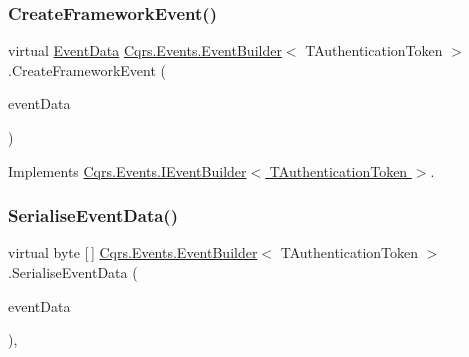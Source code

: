 \subsubsection{\texorpdfstring{Create\+Framework\+Event()}{CreateFrameworkEvent()}\hspace{0.1cm}{\footnotesize\ttfamily [2/2]}}
{\footnotesize\ttfamily virtual \hyperlink{classCqrs_1_1Events_1_1EventData}{Event\+Data} \hyperlink{classCqrs_1_1Events_1_1EventBuilder}{Cqrs.\+Events.\+Event\+Builder}$<$ T\+Authentication\+Token $>$.Create\+Framework\+Event (\begin{DoxyParamCaption}\item[{\hyperlink{interfaceCqrs_1_1Events_1_1IEvent}{I\+Event}$<$ T\+Authentication\+Token $>$}]{event\+Data }\end{DoxyParamCaption})\hspace{0.3cm}{\ttfamily [virtual]}}



Implements \hyperlink{interfaceCqrs_1_1Events_1_1IEventBuilder_a3c0cb2db87e496ad64f481a6cce2c79d_a3c0cb2db87e496ad64f481a6cce2c79d}{Cqrs.\+Events.\+I\+Event\+Builder$<$ T\+Authentication\+Token $>$}.

\mbox{\label{classCqrs_1_1Events_1_1EventBuilder_a5392c1e86ea54fb96ee7af3a57f9af5a_a5392c1e86ea54fb96ee7af3a57f9af5a}} 
\subsubsection{\texorpdfstring{Serialise\+Event\+Data()}{SerialiseEventData()}}
{\footnotesize\ttfamily virtual byte \mbox{[}$\,$\mbox{]} \hyperlink{classCqrs_1_1Events_1_1EventBuilder}{Cqrs.\+Events.\+Event\+Builder}$<$ T\+Authentication\+Token $>$.Serialise\+Event\+Data (\begin{DoxyParamCaption}\item[{\hyperlink{interfaceCqrs_1_1Events_1_1IEvent}{I\+Event}$<$ T\+Authentication\+Token $>$}]{event\+Data }\end{DoxyParamCaption})\hspace{0.3cm}{\ttfamily [protected]}, {\ttfamily [virtual]}}

\mbox{\label{classCqrs_1_1Events_1_1EventBuilder_aefa7bfaea90123e143e108d46efc6603_aefa7bfaea90123e143e108d46efc6603}} 
